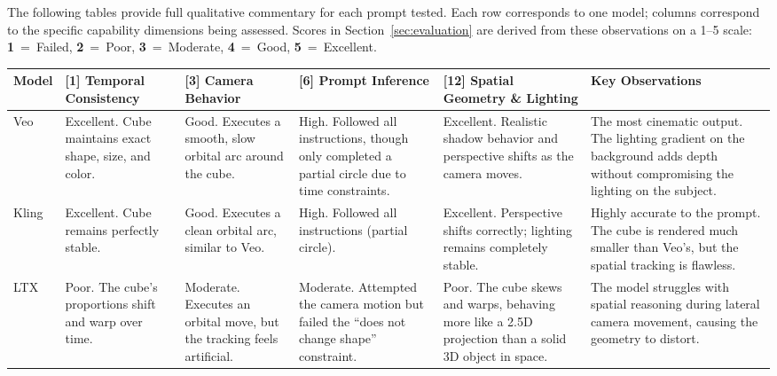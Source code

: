 \documentclass[sigconf]{acmart}
\begin{document}
The following tables provide full qualitative commentary for each prompt tested. Each row corresponds to one model; columns correspond to the specific capability dimensions being assessed. Scores in Section~\ref{sec:evaluation} are derived from these observations on a 1--5 scale: \textbf{1}~=~Failed, \textbf{2}~=~Poor, \textbf{3}~=~Moderate, \textbf{4}~=~Good, \textbf{5}~=~Excellent.

\begin{table}[H]
    \centering
    \renewcommand{\arraystretch}{1.3}
    \begin{tabularx}{\textwidth}{| l | >{\raggedright\arraybackslash}X | >{\raggedright\arraybackslash}X | >{\raggedright\arraybackslash}X | >{\raggedright\arraybackslash}X | >{\raggedright\arraybackslash}X |}
        \hline
        \textbf{Model} & \textbf{[1] Temporal Consistency}                                                & \textbf{[3] Camera Behavior}                                                         & \textbf{[6] Prompt Inference}                                                                    & \textbf{[12] Spatial Geometry \& Lighting}                                                            & \textbf{Key Observations}                                                                                                       \\ \hline
        Veo            & Excellent. Cube maintains exact shape, size, and color.                          & Good. Executes a smooth, slow orbital arc around the cube.                           & High. Followed all instructions, though only completed a partial circle due to time constraints. & Excellent. Realistic shadow behavior and perspective shifts as the camera moves.                      & The most cinematic output. The lighting gradient on the background adds depth without compromising the lighting on the subject. \\ \hline
        Kling          & Excellent. Cube remains perfectly stable.                                        & Good. Executes a clean orbital arc, similar to Veo.                                  & High. Followed all instructions (partial circle).                                                & Excellent. Perspective shifts correctly; lighting remains completely stable.                          & Highly accurate to the prompt. The cube is rendered much smaller than Veo's, but the spatial tracking is flawless.              \\ \hline
        LTX            & Poor. The cube's proportions shift and warp over time.                           & Moderate. Executes an orbital move, but the tracking feels artificial.               & Moderate. Attempted the camera motion but failed the ``does not change shape'' constraint.       & Poor. The cube skews and warps, behaving more like a 2.5D projection than a solid 3D object in space. & The model struggles with spatial reasoning during lateral camera movement, causing the geometry to distort.                     \\ \hline

\end{tabularx}
\end{table}
\end{document}
